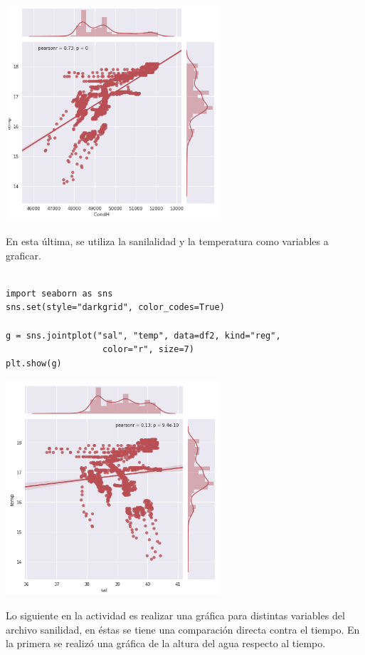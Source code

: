 \documentclass{article}
\begin{document}
\begin{center}

\includegraphics[width=8cm, height=8cm]{lin2.png}
\end{center}

En esta última, se utiliza la sanilalidad y la temperatura como variables a graficar.

\begin{verbatim}

import seaborn as sns
sns.set(style="darkgrid", color_codes=True)

g = sns.jointplot("sal", "temp", data=df2, kind="reg",
                   color="r", size=7)
plt.show(g)

\end{verbatim}

\begin{center}

\includegraphics[width=8cm, height=8cm]{lin3.png}
\end{center}


Lo siguiente en la actividad es realizar una gráfica para distintas variables del archivo sanilidad, en éstas se tiene una comparación directa contra el tiempo.
En la primera se realizó una gráfica de la altura del agua respecto al tiempo.
\end{document}
